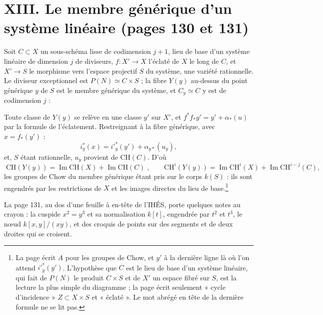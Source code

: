 \documentclass[11pt,a4paper]{article}
\begin{document}
\section*{XIII. Le membre générique d'un système linéaire (pages 130 et 131)}

Soit $C \subset X$ un sous-schéma lisse de codimension $j + 1$, lieu de base d'un
système linéaire de dimension $j$ de diviseurs, $f \colon X' \to X$ l'éclaté de
$X$ le long de $C$, et $X' \to S$ le morphisme vers l'espace projectif $S$ du
système, une variété rationnelle. Le diviseur exceptionnel est $P(N) \simeq C
\times S$ ; la fibre $Y(y)$ au-dessus du point générique $y$ de $S$ est le membre
générique du système, et $C_{y} \simeq C$ y est de codimension $j$ :


Toute classe de $Y(y)$ se relève en une classe $y'$ sur $X'$, et $f^{*}f_{*}y'
= y' + \alpha_{*}(u)$ par la formule de l'éclatement. Restreignant à la fibre
générique, avec $x = f_{*}(y')$ :
\[
i_{y}^{*}(x) = i'^{*}_{y}(y') + \alpha_{y*}(u_{y}) ,
\]
et, $S$ étant rationnelle, $u_{y}$ provient de $\mathrm{CH}(C)$. D'où
\[
\boxed{\;\mathrm{CH}(Y(y)) = \operatorname{Im}\mathrm{CH}(X) +
\operatorname{Im}\mathrm{CH}(C)\;} ,
\qquad
\mathrm{CH}^{i}(Y(y)) = \operatorname{Im}\mathrm{CH}^{i}(X) +
\operatorname{Im}\mathrm{CH}^{i-j}(C) ,
\]
les groupes de Chow du membre générique étant pris sur le corps $k(S)$ : ils sont
engendrés par les restrictions de $X$ et les images directes du lieu de
base.\footnote{La page écrit $A$ pour les groupes de Chow, et $y'$ à la dernière
ligne là où l'on attend $i'^{*}_{y}(y')$. L'hypothèse que $C$ est le lieu de
base d'un système linéaire, qui fait de $P(N)$ le produit $C \times S$ et de
$X'$ un espace fibré sur $S$, est la lecture la plus simple du diagramme ;
la page écrit seulement « cycle d'incidence » $Z \subset X \times S$ et
« éclaté ». Le mot abrégé en tête de la dernière formule ne se lit pas.}

La page 131, au dos d'une feuille à en-tête de l'IHÉS, porte quelques notes au
crayon : la cuspide $x^{2} = y^{3}$ et sa normalisation $k[t]$, engendrée par
$t^{2}$ et $t^{3}$, le nœud $k[x, y]/(xy)$, et des croquis de points sur des
segments et de deux droites qui se croisent.
\end{document}
